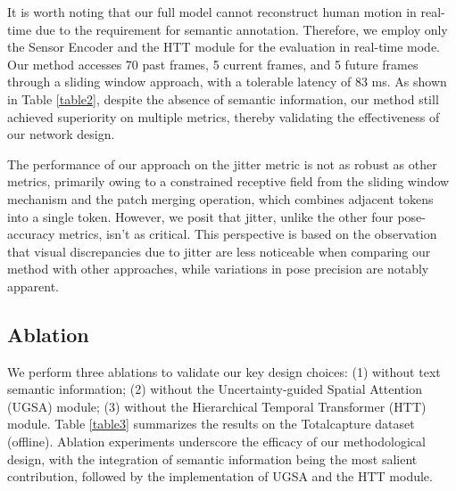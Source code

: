 \documentclass[letterpaper]{article} %
\begin{document}

It is worth noting that our full model cannot reconstruct human motion in real-time due to the requirement for semantic annotation. Therefore, we employ only the Sensor Encoder and the HTT module for the evaluation in real-time mode. Our method accesses 70 past frames, 5 current frames, and 5 future frames through a sliding window approach, with a tolerable latency of 83 ms. As shown in Table \ref{table2}, despite the absence of semantic information, our method still achieved superiority on multiple metrics, thereby validating the effectiveness of our network design.

The performance of our approach on the jitter metric is not as robust as other metrics, primarily owing to a constrained receptive field from the sliding window mechanism and the patch merging operation, which combines adjacent tokens into a single token. However, we posit that jitter,
unlike the other four pose-accuracy metrics, isn’t as critical. This perspective is based on the observation that visual discrepancies due to jitter are less noticeable when comparing our method with other approaches, while variations in pose precision are notably apparent.



\subsection{Ablation} 
We perform three ablations to validate our key design choices: (1) without text semantic information; (2) without the Uncertainty-guided Spatial Attention (UGSA) module; (3) without the Hierarchical Temporal Transformer (HTT) module. Table \ref{table3} summarizes the results on the Totalcapture dataset (offline).
Ablation experiments underscore the efficacy of our methodological design, with the integration of semantic information being the most salient contribution, followed by the implementation of UGSA and the HTT module.
\end{document}
